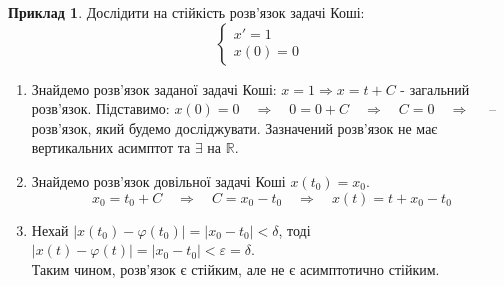 \documentclass[14pt,a4paper]{scrartcl}
\theoremstyle{definition}
\newtheorem*{example}{Приклад}
\theoremstyle{definition}
\theoremstyle{definition}
\begin{document}
\begin{example}
    Дослідити на стійкість розв'язок задачі Коші:
$$
\begin{cases}
    x' = 1 \\
    x(0) = 0
\end{cases}
$$

\begin{enumerate}
\item Знайдемо розв'язок заданої задачі Коші: $x = 1 \Rightarrow x = t + C$ - загальний розв'язок. Підставимо: $ x(0) = 0 \quad \Rightarrow \quad 0 = 0 + C \quad \Rightarrow \quad C = 0 \quad \Rightarrow \quad$  -- розв'язок, який будемо досліджувати.
Зазначений розв'язок не має вертикальних асимптот та $\exists$ на $\mathbb{R}$.

\item Знайдемо розв'язок довільної задачі Коші $x(t_0) = x_0$.
$$
x_0 = t_0 + C \quad \Rightarrow \quad C = x_0 - t_0 \quad \Rightarrow \quad x(t) = t + x_0 - t_0
$$
\item Нехай $  \left| x(t_0) - \varphi(t_0) \right|  =  \left| x_0 - t_0 \right| < \delta$, тоді $ \left| x (t) - \varphi (t) \right|  = \left|  x_0 - t_0 \right| < \varepsilon = \delta $.\\
Таким чином, розв'язок є стійким, але не є асимптотично стійким.

\end{enumerate}

\end{example}
\end{document}

